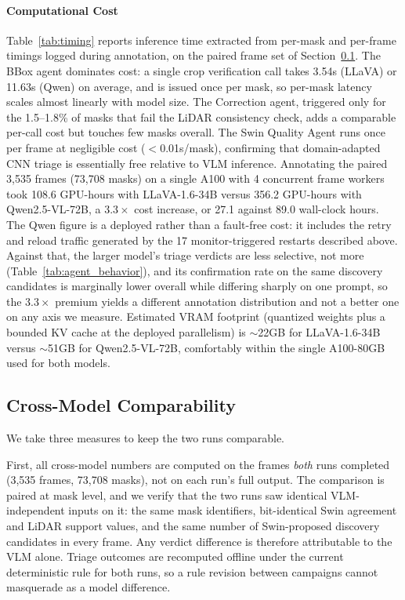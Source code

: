 \documentclass[conference]{IEEEtran}
\begin{document}
\paragraph{Computational Cost}
Table~\ref{tab:timing} reports inference time extracted from per-mask and per-frame timings logged during annotation, on the paired frame set of Section~\ref{par:comparability}.
The BBox agent dominates cost: a single crop verification call takes 3.54s (LLaVA) or 11.63s (Qwen) on average, and is issued once per mask, so per-mask latency scales almost linearly with model size.
The Correction agent, triggered only for the 1.5--1.8\% of masks that fail the LiDAR consistency check, adds a comparable per-call cost but touches few masks overall.
The Swin Quality Agent runs once per frame at negligible cost ($<$0.01s/mask), confirming that domain-adapted CNN triage is essentially free relative to VLM inference.
Annotating the paired 3{,}535 frames (73{,}708 masks) on a single A100 with 4 concurrent frame workers took 108.6 GPU-hours with LLaVA-1.6-34B versus 356.2 GPU-hours with Qwen2.5-VL-72B, a $3.3\times$ cost increase, or 27.1 against 89.0 wall-clock hours.
The Qwen figure is a deployed rather than a fault-free cost: it includes the retry and reload traffic generated by the 17 monitor-triggered restarts described above.
Against that, the larger model's triage verdicts are less selective, not more (Table~\ref{tab:agent_behavior}), and its confirmation rate on the same discovery candidates is marginally lower overall while differing sharply on one prompt, so the $3.3\times$ premium yields a different annotation distribution and not a better one on any axis we measure.
Estimated VRAM footprint (quantized weights plus a bounded KV cache at the deployed parallelism) is $\sim$22GB for LLaVA-1.6-34B versus $\sim$51GB for Qwen2.5-VL-72B, comfortably within the single A100-80GB used for both models.



\subsection{Cross-Model Comparability}
\label{par:comparability}
We take three measures to keep the two runs comparable.

First, all cross-model numbers are computed on the frames \emph{both} runs completed (3{,}535 frames, 73{,}708 masks), not on each run's full output.
The comparison is paired at mask level, and we verify that the two runs saw identical VLM-independent inputs on it: the same mask identifiers, bit-identical Swin agreement and LiDAR support values, and the same number of Swin-proposed discovery candidates in every frame.
Any verdict difference is therefore attributable to the VLM alone.
Triage outcomes are recomputed offline under the current deterministic rule for both runs, so a rule revision between campaigns cannot masquerade as a model difference.
\end{document}
